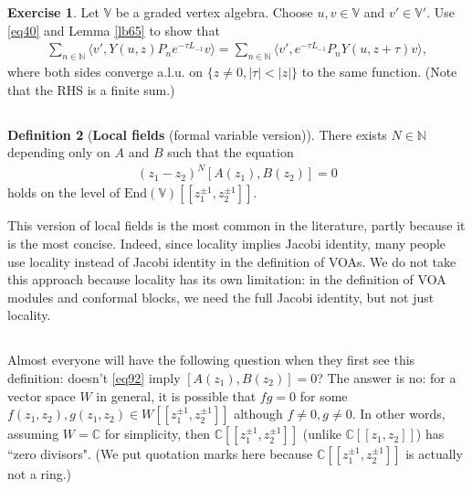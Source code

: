 \documentclass[12pt,a4paper,notitlepage]{article}
\theoremstyle{definition}
\newtheorem{df}{Definition}[section]
\newtheorem{exe}[df]{Exercise}
\theoremstyle{plain}
\newcommand{\End}{\mathrm{End}} %
\newcommand{\bigbk}[1]{\big\langle {#1}\big\rangle}
\newcommand{\Vbb}{\mathbb V}
\newcommand{\Cbb}{\mathbb C}
\newcommand{\Nbb}{\mathbb N}
\numberwithin{equation}{section}
\begin{document}
\begin{exe}\label{lb89}
Let $\Vbb$ be a graded vertex algebra. Choose $u,v\in\Vbb$ and $v'\in\Vbb'$.  Use \eqref{eq40} and Lemma \ref{lb65} to show that
\begin{align}
\sum_{n\in\Nbb}\bigbk{v',Y(u,z)P_ne^{-\tau L_{-1}}v}=\sum_{n\in\Nbb}\bigbk{v',e^{-\tau L_{-1}}P_nY(u,z+\tau)v},
\end{align}
where both sides converge a.l.u. on $\{z\neq 0,|\tau|<|z|\}$ to the same function. (Note that the RHS is a finite sum.)
\end{exe}



\subsection{}


\begin{df}[\textbf{Local fields} (formal variable version)]
There exists $N\in\Nbb$ depending only on $A$ and $B$ such that the equation
\begin{align}
(z_1-z_2)^N[A(z_1),B(z_2)]=0\label{eq92}	
\end{align}
holds on the level of $\End(\Vbb)[[z_1^{\pm1},z_2^{\pm1}]]$.
\end{df}

This version of local fields is the most common in the literature, partly because it is the most concise. Indeed, since locality implies Jacobi identity, many people use locality instead of Jacobi identity in the definition of VOAs. We do not take this approach because locality has its own limitation: in the definition of VOA modules and conformal blocks, we need the full Jacobi identity, but not just locality.


\subsection{}\label{lb64}

Almost everyone will have the following question when they first see this definition: doesn't \eqref{eq92} imply $[A(z_1),B(z_2)]=0$? The answer is no: for a vector space $W$ in general, it is possible that $fg=0$ for some $f(z_1,z_2),g(z_1,z_2)\in W[[z_1^{\pm1},z_2^{\pm1}]]$ although $f\neq 0,g\neq 0$. In other words, assuming $W=\Cbb$ for simplicity, then $\Cbb[[z_1^{\pm1},z_2^{\pm1}]]$ (unlike $\Cbb[[z_1,z_2]]$) has ``zero divisors". (We put quotation marks here because $\Cbb[[z_1^{\pm1},z_2^{\pm1}]]$ is actually not a ring.)
\end{document}
